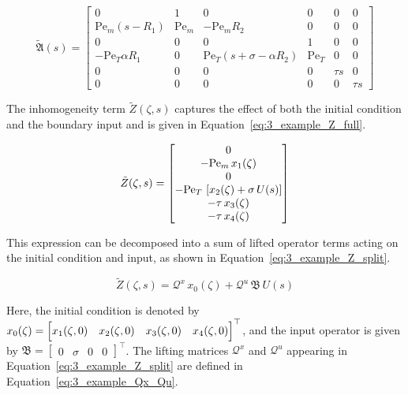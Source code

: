 \begin{equation} \label{eq:3_example_Atilde}
\tilde{\mathfrak{A}}(s) =
\begin{bmatrix}
0 & 1 & 0 & 0 & 0 & 0 \\
\mathrm{Pe}_m(s - R_1) & \mathrm{Pe}_m & -\mathrm{Pe}_m R_2 & 0 & 0 & 0 \\
0 & 0 & 0 & 1 & 0 & 0 \\
-\mathrm{Pe}_T \alpha R_1 & 0 & \mathrm{Pe}_T(s + \sigma - \alpha R_2) & \mathrm{Pe}_T & 0 & 0 \\
0 & 0 & 0 & 0 & \tau s & 0 \\
0 & 0 & 0 & 0 & 0 & \tau s
\end{bmatrix}
\end{equation}

The inhomogeneity term $\tilde{Z}(\zeta, s)$ captures the effect of both the initial condition and the boundary input and is given in Equation~\eqref{eq:3_example_Z_full}.

\begin{equation} \label{eq:3_example_Z_full}
\tilde{Z}(\zeta, s) =
\begin{bmatrix}
0 \\
-{\rm Pe}_m\, x_1(\zeta) \\
0 \\
-{\rm Pe}_T\, \left[ x_2(\zeta) + \sigma\, U(s) \right] \\
-\tau\, x_3(\zeta) \\
-\tau\, x_4(\zeta)
\end{bmatrix}
\end{equation}

This expression can be decomposed into a sum of lifted operator terms acting on the initial condition and input, as shown in Equation~\eqref{eq:3_example_Z_split}.

\begin{equation} \label{eq:3_example_Z_split}
\tilde{Z}(\zeta, s) = \mathcal{Q}^x\, x_0(\zeta) + \mathcal{Q}^u\, \mathfrak{B}\, U(s)
\end{equation}

Here, the initial condition is denoted by $x_0(\zeta) = \Bigl[ x_1(\zeta, 0) \allowbreak \quad x_2(\zeta, 0) \allowbreak \quad x_3(\zeta, 0) \allowbreak \quad x_4(\zeta, 0) \Bigr]^\top$, and the input operator is given by $\mathfrak{B} = \begin{bmatrix} 0 & \sigma & 0 & 0 \end{bmatrix}^\top$. The lifting matrices $\mathcal{Q}^x$ and $\mathcal{Q}^u$ appearing in Equation~\eqref{eq:3_example_Z_split} are defined in Equation~\eqref{eq:3_example_Qx_Qu}.

